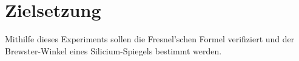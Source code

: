 \section{Zielsetzung}
\label{sec:Zielsetzung}

Mithilfe dieses Experiments sollen die Fresnel'schen Formel verifiziert und
der Brewster-Winkel eines Silicium-Spiegels bestimmt werden.